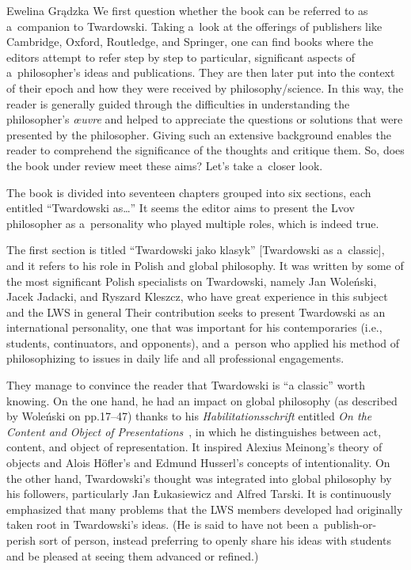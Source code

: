 \begin{newrevengenv}{Ewelina Grądzka}
We first question whether the book can be referred to as a~companion to Twardowski. Taking a~look at the offerings of publishers like Cambridge, Oxford, Routledge, and Springer, one can find books where the editors attempt to refer step by step to particular, significant aspects of a~philosopher's ideas and publications. They are then later put into the context of their epoch and how they were received by philosophy/science. In this way, the reader is generally guided through the difficulties in understanding the philosopher's \textit{œuvre } and helped to appreciate the questions or solutions that were presented by the philosopher. Giving such an extensive background enables the reader to comprehend the significance of the thoughts and critique them. So, does the book under review meet these aims? Let's take a~closer look.

The book is divided into seventeen chapters grouped into six sections, each entitled ``Twardowski as…'' It seems the editor aims to present the Lvov philosopher as a~personality who played multiple roles, which is indeed true.

The first section is titled ``Twardowski jako klasyk'' [Twardowski as a~classic], and it refers to his role in Polish and global philosophy. It was written by some of the most significant Polish specialists on Twardowski, namely Jan Woleński, Jacek Jadacki, and Ryszard Kleszcz, who have great experience in this subject and the LWS in general
\parencites[cf.][]{wolenski_filozoficzna_1985}{jadacki_semiotyka_1989}{jadacki_viewpoint_2003}{jadacki_polish_2009}{jadacki_polish_2015}{brandl_actions_1999}{jadacki_lvov-warsaw_2006}{kleszcz_metoda_2013}{chybinska_tradition_2016}{brozek_significance_2017}
Their contribution seeks to present Twardowski as an international personality, one that was important for his contemporaries (i.e., students, continuators, and opponents), and a~person who applied his method of philosophizing to issues in daily life and all professional engagements.

They manage to convince the reader that Twardowski is ``a classic'' worth knowing. On the one hand, he had an impact on global philosophy (as described by Woleński on pp.17–47) thanks to his \textit{Habilitationsschrift} entitled \textit{On the Content and Object of Presentations}~\parencite*{twardowski_1894},
in which he distinguishes between act, content, and object of representation. It inspired Alexius Meinong's theory of objects and Alois Höfler's and Edmund Husserl's concepts of intentionality. On the other hand, Twardowski's thought was integrated into global philosophy by his followers, particularly Jan Łukasiewicz and Alfred Tarski. It is continuously emphasized that many problems that the LWS members developed had originally taken root in Twardowski's ideas. (He is said to have not been a~publish-or-perish sort of person, instead preferring to openly share his ideas with students and be pleased at seeing them advanced or refined.)


\end{newrevengenv}
